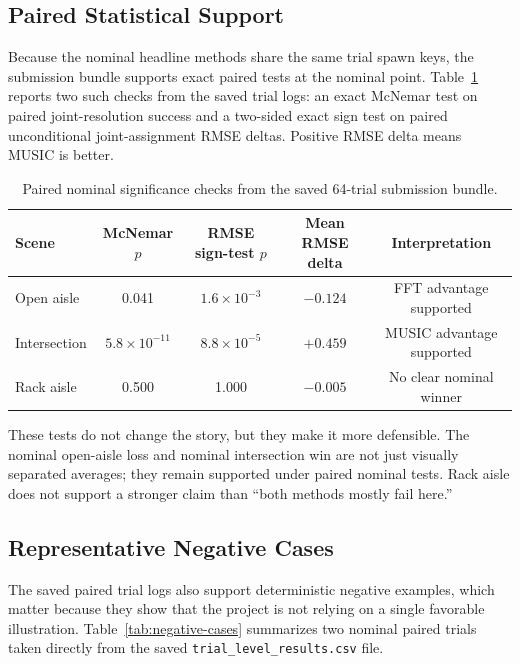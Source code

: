 \documentclass[11pt]{article}
\begin{document}
\subsection{Paired Statistical Support}

Because the nominal headline methods share the same trial spawn keys, the submission bundle supports exact paired tests at the nominal point. Table~\ref{tab:paired-significance} reports two such checks from the saved trial logs: an exact McNemar test on paired joint-resolution success and a two-sided exact sign test on paired unconditional joint-assignment RMSE deltas. Positive RMSE delta means MUSIC is better.

\begin{table}[H]
\centering
\small
\caption{Paired nominal significance checks from the saved 64-trial submission bundle.}
\label{tab:paired-significance}
\begin{tabular}{lcccc}
\toprule
Scene & McNemar $p$ & RMSE sign-test $p$ & Mean RMSE delta & Interpretation \\
\midrule
Open aisle & 0.041 & $1.6 \times 10^{-3}$ & $-0.124$ & FFT advantage supported \\
Intersection & $5.8 \times 10^{-11}$ & $8.8 \times 10^{-5}$ & $+0.459$ & MUSIC advantage supported \\
Rack aisle & 0.500 & 1.000 & $-0.005$ & No clear nominal winner \\
\bottomrule
\end{tabular}
\end{table}

These tests do not change the story, but they make it more defensible. The nominal open-aisle loss and nominal intersection win are not just visually separated averages; they remain supported under paired nominal tests. Rack aisle does not support a stronger claim than ``both methods mostly fail here.''

\subsection{Representative Negative Cases}

The saved paired trial logs also support deterministic negative examples, which matter because they show that the project is not relying on a single favorable illustration. Table~\ref{tab:negative-cases} summarizes two nominal paired trials taken directly from the saved \texttt{trial\_level\_results.csv} file.
\end{document}
